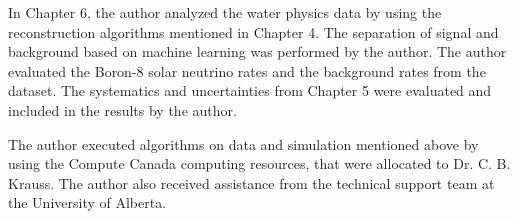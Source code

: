 In Chapter 6, the author analyzed the water physics data by using the reconstruction algorithms mentioned in Chapter 4. The separation of signal and background based on machine learning was performed by the author. The author evaluated the Boron-8 solar neutrino rates and the background rates from the dataset. The systematics and uncertainties from Chapter 5 were evaluated and included in the results by the author.

The author executed algorithms on data and simulation mentioned above by using the Compute Canada computing resources, that were allocated to Dr. C. B. Krauss. The author also received assistance from the technical support team at the University of Alberta.
